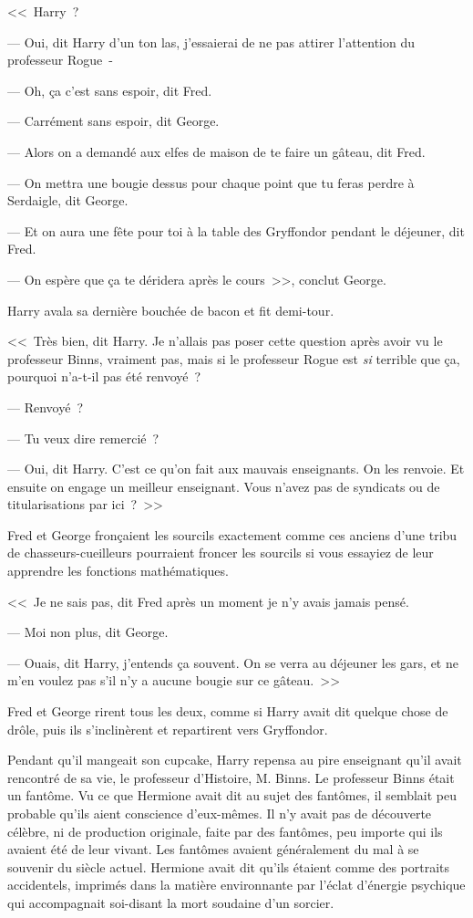 <<~Harry~?

--- Oui, dit Harry d'un ton las, j'essaierai de ne pas attirer l'attention du professeur Rogue~-

--- Oh, ça c'est sans espoir, dit Fred.

--- Carrément sans espoir, dit George.

--- Alors on a demandé aux elfes de maison de te faire un gâteau, dit Fred.

--- On mettra une bougie dessus pour chaque point que tu feras perdre à Serdaigle, dit George.

--- Et on aura une fête pour toi à la table des Gryffondor pendant le déjeuner, dit Fred.

--- On espère que ça te déridera après le cours~>>, conclut George.

Harry avala sa dernière bouchée de bacon et fit demi-tour.

<<~Très bien, dit Harry. Je n'allais pas poser cette question après avoir vu le professeur Binns, vraiment pas, mais si le professeur Rogue est \emph{si} terrible que ça, pourquoi n'a-t-il pas été renvoyé~?

--- Renvoyé~?

--- Tu veux dire remercié~?

--- Oui, dit Harry. C'est ce qu'on fait aux mauvais enseignants. On les renvoie. Et ensuite on engage un meilleur enseignant. Vous n'avez pas de syndicats ou de titularisations par ici~?~>>

Fred et George fronçaient les sourcils exactement comme ces anciens d'une tribu de chasseurs-cueilleurs pourraient froncer les sourcils si vous essayiez de leur apprendre les fonctions mathématiques.

<<~Je ne sais pas, dit Fred après un moment je n'y avais jamais pensé.

--- Moi non plus, dit George.

--- Ouais, dit Harry, j'entends ça souvent. On se verra au déjeuner les gars, et ne m'en voulez pas s'il n'y a aucune bougie sur ce gâteau.~>>

Fred et George rirent tous les deux, comme si Harry avait dit quelque chose de drôle, puis ils s'inclinèrent et repartirent vers Gryffondor.

Pendant qu'il mangeait son cupcake, Harry repensa au pire enseignant qu'il avait rencontré de sa vie, le professeur d'Histoire, M. Binns. Le professeur Binns était un fantôme. Vu ce que Hermione avait dit au sujet des fantômes, il semblait peu probable qu'ils aient conscience d'eux-mêmes. Il n'y avait pas de découverte célèbre, ni de production originale, faite par des fantômes, peu importe qui ils avaient été de leur vivant. Les fantômes avaient généralement du mal à se souvenir du siècle actuel. Hermione avait dit qu'ils étaient comme des portraits accidentels, imprimés dans la matière environnante par l'éclat d'énergie psychique qui accompagnait soi-disant la mort soudaine d'un sorcier.

